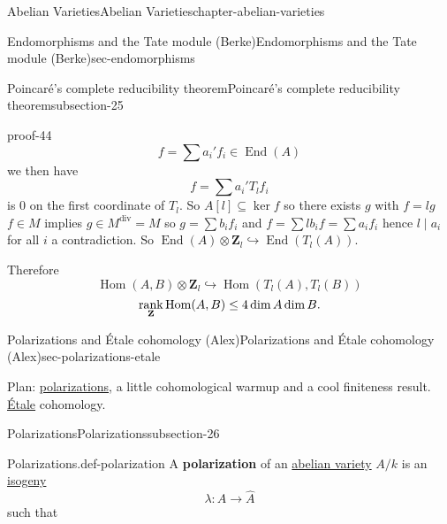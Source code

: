 \documentclass[oneside,10pt,]{book}
\newcommand{\terminology}[1]{\textbf{#1}}
\renewcommand{\qedhere}{\relax}
\numberwithin{equation}{section}
\newcommand{\lb}{[}
\newcommand{\rb}{]}
\newcommand{\ZZ}{\mathbf{Z}}
\DeclareMathOperator{\End}{End}
\DeclareMathOperator{\Hom}{Hom}
\DeclareMathOperator{\rank}{rank}
\begin{document}
\begin{chapterptx}{Abelian Varieties}{}{Abelian Varieties}{}{}{chapter-abelian-varieties}
\begin{sectionptx}{Endomorphisms and the Tate module (Berke)}{}{Endomorphisms and the Tate module (Berke)}{}{}{sec-endomorphisms}
\begin{subsectionptx}{Poincaré's complete reducibility theorem}{}{Poincaré's complete reducibility theorem}{}{}{subsection-25}
\begin{proofptx}{}{proof-44}
\begin{equation*}
f = \sum a_i' f_i \in \End(A)
\end{equation*}
we then have%
\begin{equation*}
f = \sum a_i' T_lf_i
\end{equation*}
is 0 on the first coordinate of \(T_l\). So \(A\lb l \rb \subseteq \ker f\) so there exists \(g\) with \(f= lg\) \(f\in M\) implies \(g\in M^\text{div} = M\) so \(g = \sum b_i f_i\) and \(f = \sum lb_i f = \sum a_i f_i\) hence \(l\mid a_i\) for all \(i\) a contradiction. So \(\End(A)\otimes \ZZ_l \hookrightarrow \End(T_l(A))\).%
\par
\hypertarget{p-242}{}%
Therefore%
\begin{equation*}
\Hom(A,B) \otimes \ZZ_l \hookrightarrow \Hom(T_l(A), T_l(B))
\end{equation*}
%
\begin{equation*}
\rank_\ZZ \Hom(A,B) \le 4 \dim A\dim B\text{.}\qedhere
\end{equation*}
%
\end{proofptx}
\end{subsectionptx}
\end{sectionptx}
%
%
\typeout{************************************************}
\typeout{************************************************}
%
\begin{sectionptx}{Polarizations and Étale cohomology (Alex)}{}{Polarizations and Étale cohomology (Alex)}{}{}{sec-polarizations-etale}
\begin{introduction}{}%
\hypertarget{p-243}{}%
Plan: \hyperref[def-c-pol]{polarizations}, a little cohomological warmup and a cool finiteness result. \hyperref[def-etale]{Étale} cohomology.%
\end{introduction}%
%
%
\typeout{************************************************}
\typeout{************************************************}
%
\begin{subsectionptx}{Polarizations}{}{Polarizations}{}{}{subsection-26}
\begin{definition}{Polarizations.}{def-polarization}%
\hypertarget{p-244}{}%
A \terminology{polarization} of an \hyperref[def-buntes-abvar]{abelian variety} \(A/k\) is an \hyperref[def-supersing-isog-isog]{isogeny}%
\begin{equation*}
\lambda \colon A \to \hat A
\end{equation*}
such that%
\begin{equation*}

\end{equation*}
\end{definition}
\end{subsectionptx}
\end{sectionptx}
\end{chapterptx}
\end{document}
